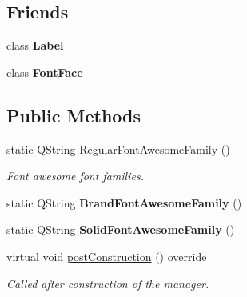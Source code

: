 \subsection*{Friends}
\begin{DoxyCompactItemize}
\item 
\mbox{\label{classrev_1_1_font_manager_a74b0083ac0ac6b3e797aa115d23e5e93}} 
class {\bfseries Label}
\item 
\mbox{\label{classrev_1_1_font_manager_aa9627c9772feb41db6450011b1efdb92}} 
class {\bfseries Font\+Face}
\end{DoxyCompactItemize}
\subsection*{Public Methods}
\begin{DoxyCompactItemize}
\item 
\mbox{\label{classrev_1_1_font_manager_a0ac647b2ac0597cb23a53fbf65374996}} 
static Q\+String \mbox{\hyperlink{classrev_1_1_font_manager_a0ac647b2ac0597cb23a53fbf65374996}{Regular\+Font\+Awesome\+Family}} ()
\begin{DoxyCompactList}\small\item\em Font awesome font families. \end{DoxyCompactList}\item 
\mbox{\label{classrev_1_1_font_manager_acd6abe1c1100a9004e3df007f5537107}} 
static Q\+String {\bfseries Brand\+Font\+Awesome\+Family} ()
\item 
\mbox{\label{classrev_1_1_font_manager_a6edbfc440f7c1a0bb5af753f0ae8b38d}} 
static Q\+String {\bfseries Solid\+Font\+Awesome\+Family} ()
\item 
\mbox{\label{classrev_1_1_font_manager_a6e27e37302ff3aba4515db4dbde904db}} 
virtual void \mbox{\hyperlink{classrev_1_1_font_manager_a6e27e37302ff3aba4515db4dbde904db}{post\+Construction}} () override
\begin{DoxyCompactList}\small\item\em Called after construction of the manager. \end{DoxyCompactList}\end{DoxyCompactItemize}
